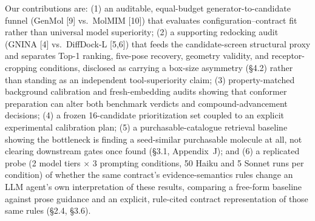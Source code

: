 \documentclass{article}
\begin{document}
Our contributions are: (1) an auditable, equal-budget generator-to-candidate funnel (GenMol [9] vs.\ MolMIM [10]) that evaluates configuration--contract fit rather than universal model superiority; (2) a supporting redocking audit (GNINA [4] vs.\ DiffDock-L [5,6]) that feeds the candidate-screen structural proxy and separates Top-1 ranking, five-pose recovery, geometry validity, and receptor-cropping conditions, disclosed as carrying a box-size asymmetry (\S4.2) rather than standing as an independent tool-superiority claim; (3) property-matched background calibration and fresh-embedding audits showing that conformer preparation can alter both benchmark verdicts and compound-advancement decisions; (4) a frozen 16-candidate prioritization set coupled to an explicit experimental calibration plan; (5) a purchasable-catalogue retrieval baseline showing the bottleneck is finding a seed-similar purchasable molecule at all, not clearing downstream gates once found (\S3.1, Appendix~J); and (6) a replicated probe (2 model tiers $\times$ 3 prompting conditions, 50 Haiku and 5 Sonnet runs per condition) of whether the same contract's evidence-semantics rules change an LLM agent's own interpretation of these results, comparing a free-form baseline against prose guidance and an explicit, rule-cited contract representation of those same rules (\S2.4, \S3.6).
\end{document}
